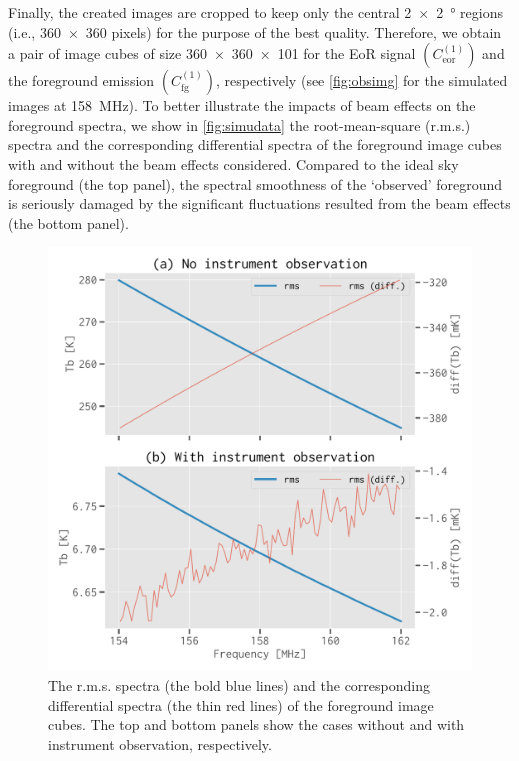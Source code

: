 \documentclass[fleqn,usenatbib]{mnras}
\newlength{\myfigwidth}
\newcommand{\R}[1]{\mathrm{#1}}
\newcommand{\editwip}[1]{{\leavevmode\color{magenta}#1}}
\begin{document}
Finally, the created images are cropped to keep only the central
\SI{2 x 2}{\degree} regions (i.e., \num{360 x 360} pixels) for the
purpose of the best quality.
Therefore, we obtain \editwip{a pair of} image cubes of size
\num{360 x 360 x 101} for the EoR signal $\left( C_{\R{eor}}^{(1)} \right)$
and the foreground emission $\left( C_{\R{fg}}^{(1)} \right)$, respectively
\editwip{%
(see \autoref{fig:obsimg} for the simulated images at \SI{158}{\MHz}).
To better illustrate the impacts of beam effects on the foreground spectra,
we show in \autoref{fig:simudata} the root-mean-square (r.m.s\@.) spectra
and the corresponding differential spectra of the foreground image cubes
with and without the beam effects considered.
Compared to the ideal sky foreground (the top panel), the spectral
smoothness of the `observed' foreground is seriously damaged by the
significant fluctuations resulted from the beam effects (the bottom panel).
} %

\begin{figure}
  \centering
  \includegraphics[width=\myfigwidth]{simudata}
  \caption{\label{fig:simudata}\editwip{%
    The r.m.s\@. spectra (the bold blue lines) and the corresponding
    differential spectra (the thin red lines) of the foreground image
    cubes.} %
    The top and bottom panels show the cases without and with instrument
    observation, respectively.
  }
\end{figure}
\end{document}
